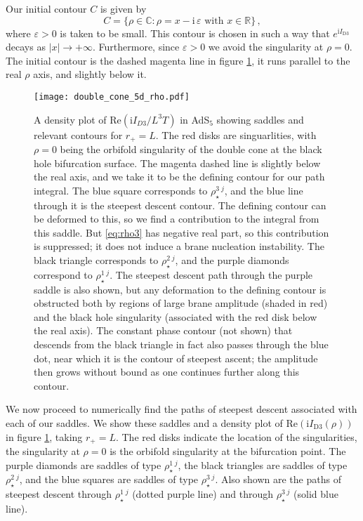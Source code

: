 \documentclass[11pt]{article}
\renewcommand{\i}{\mathrm{i}}
\begin{document}
Our initial contour $C$ is given by
\begin{equation}
C=\{\rho \in \mathbb{C}:\rho = x-\i\,\varepsilon\text{ with }x\in\mathbb{R}\}\,,
\label{rhocontourequation}
\end{equation}
where $\varepsilon>0$ is taken to be small. 
This contour is chosen in such a way that $e^{\i I_{\mathrm{D}3}}$ decays as $|x|\to+\infty$. 
Furthermore, since $\varepsilon>0$ we avoid the singularity at $\rho=0$.
The initial contour is the dashed magenta line in figure \ref{fig:sub}, it runs parallel to the real $\rho$ axis, and slightly below it.

\begin{figure}[t]
    \centering
    \texttt{[image: double\_cone\_5d\_rho.pdf]}
    \caption{A density plot of $\mathrm{Re}\left(\i I_{D3}/L^3T\right)$ in AdS$_5$ showing saddles and relevant contours for $r_+=L$.
    The red disks are singuarlities, with $\rho=0$ being the orbifold singularity of the double cone at the black hole bifurcation surface.
    The magenta dashed line is slightly below the real axis, and we take it to be the defining contour for our path integral.
    The blue square corresponds to $\rho^{3\;j}_\star$, and the blue line through it is the steepest descent contour.
    The defining contour can be deformed to this, so we find a contribution to the integral from this saddle.  But \eqref{eq:rho3} has negative real part, so this contribution is suppressed; it does not induce a brane nucleation instability.
    The black triangle corresponds to $\rho^{2\;j}_\star$, and the purple diamonds correspond to $\rho^{1\;j}_\star$.
    The steepest descent path through the purple saddle is also shown, but any deformation to the defining contour is obstructed both by regions of large brane amplitude (shaded in red) and the black hole singularity (associated with the red disk below the real axis). The constant phase contour (not shown) that descends from the black triangle in fact also passes through the blue dot, near which it is the contour of steepest ascent; the amplitude then grows without bound as one continues further along this contour. }
    \label{fig:sub}
\end{figure}
We now proceed to numerically find the paths of steepest descent associated with each of our saddles.
We show these saddles and a density plot of $\mathrm{Re}\left(\i I_{\mathrm{D}3}(\rho)\right)$ in figure \ref{fig:sub}, taking $r_+=L$.
The red disks indicate the location of the singularities, the singularity at $\rho=0$ is the orbifold singularity at the bifurcation point.
The purple diamonds are saddles of type $\rho^{1\;j}_\star$,
the black triangles are saddles of type $\rho^{2\;j}_\star$,
and the blue squares are saddles of type $\rho^{3\;j}_\star$.
Also shown are the paths of steepest descent through $\rho^{1\;j}_\star$ (dotted purple line) and through $\rho^{3\;j}_\star$ (solid blue line).
\end{document}
